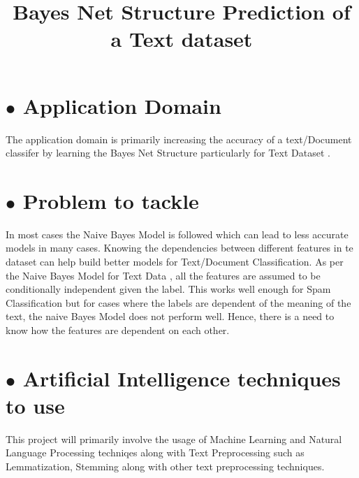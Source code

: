 \documentclass[]{article}
\title{Bayes Net Structure Prediction of a Text dataset}
\date{}
\begin{document}
\nocite{*}

\maketitle
\vspace{-60.6pt}

\section*{$\bullet$ Application Domain}

The application domain is primarily increasing the accuracy of a text/Document classifer by learning the Bayes Net Structure particularly for Text Dataset . 
\vspace{-10.6pt}
\section*{$\bullet$ Problem to tackle}

In most cases the Naive Bayes Model is followed which can lead to less accurate models in many cases. Knowing the dependencies between different features in te dataset can help build better models for Text/Document Classification. As per the Naive Bayes Model for Text Data , all the features are assumed to be conditionally independent given the label. This works well enough for Spam Classification but for cases where the labels are dependent of the meaning of the text, the naive Bayes Model does not perform well. Hence, there is a need to know how the features are dependent on each other.

\section*{$\bullet$ Artificial Intelligence techniques to use}
\vspace{-5.6pt}
This project will primarily involve the usage of Machine Learning and Natural Language Processing techniqes along with Text Preprocessing such as Lemmatization, Stemming along with other text preprocessing techniques.
\vspace{-5.6pt}


\end{document}
